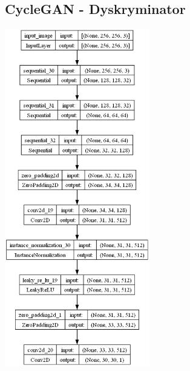 \documentclass{article}
\begin{document}
\begin{multicols}{2}
\subsection{CycleGAN - Dyskryminator}
    \includegraphics[width=0.475\textwidth]{../imgs/cyclegan_discriminator.png}
\end{multicols}
\newpage
\end{document}
